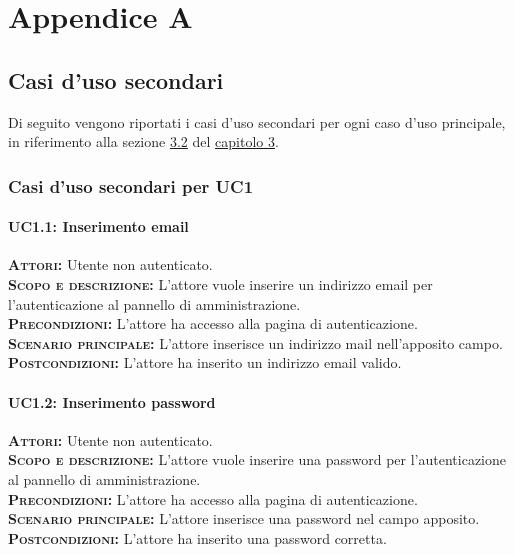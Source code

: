 
\appendix
\chapter{Appendice A}
\label{sec:AppendixA}
\section{Casi d'uso secondari}
Di seguito vengono riportati i casi d'uso secondari per ogni caso d'uso principale, in riferimento alla sezione \hyperref[sec:usecase]{3.2} del \hyperref[sec:chap3]{capitolo 3}.
\setlength{\parindent}{0cm}
\subsection{Casi d'uso secondari per UC1}
\subsubsection{UC1.1: Inserimento email}
\label{sec:uc11}
\textsc{\textbf{Attori:}} Utente non autenticato.\\
\textsc{\textbf{Scopo e descrizione:}} L'attore vuole inserire un indirizzo email per l'autenticazione al pannello di amministrazione.\\
\textsc{\textsc{\textbf{Precondizioni:}}} L'attore ha accesso alla pagina di autenticazione.\\
\textsc{\textbf{Scenario principale:}} L'attore inserisce un indirizzo mail nell'apposito campo.\\
\textsc{\textbf{Postcondizioni:}} L'attore ha inserito un indirizzo email valido.

\subsubsection{UC1.2: Inserimento password}
\label{sec:uc12}
\textsc{\textbf{Attori:}} Utente non autenticato.\\
\textsc{\textbf{Scopo e descrizione:}} L'attore vuole inserire una password per l'autenticazione al pannello di amministrazione.\\
\textsc{\textsc{\textbf{Precondizioni:}}} L'attore ha accesso alla pagina di autenticazione.\\
\textsc{\textbf{Scenario principale:}} L'attore inserisce una password nel campo apposito.\\
\textsc{\textbf{Postcondizioni:}} L'attore ha inserito una password corretta.

